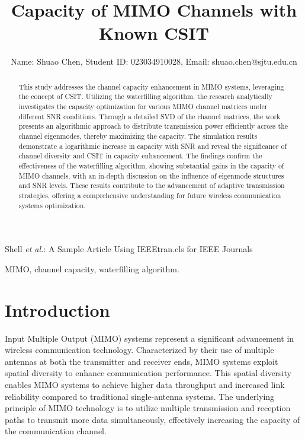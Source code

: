 \documentclass[lettersize,journal]{IEEEtran}
\begin{document}
\title{Capacity of MIMO Channels with Known CSIT}

\author{Name: Shuao Chen, Student ID: 023034910028, Email: shuao.chen@sjtu.edu.cn
}

%
{Shell \MakeLowercase{\textit{et al.}}: A Sample Article Using IEEEtran.cls for IEEE Journals}


\maketitle

\begin{abstract}
This study addresses the channel capacity enhancement in MIMO systems, leveraging the concept of CSIT. Utilizing the waterfilling algorithm, the research analytically investigates the capacity optimization for various MIMO channel matrices under different SNR conditions. Through a detailed SVD of the channel matrices, the work presents an algorithmic approach to distribute transmission power efficiently across the channel eigenmodes, thereby maximizing the capacity. The simulation results demonstrate a logarithmic increase in capacity with SNR and reveal the significance of channel diversity and CSIT in capacity enhancement. The findings confirm the effectiveness of the waterfilling algorithm, showing substantial gains in the capacity of MIMO channels, with an in-depth discussion on the influence of eigenmode structures and SNR levels. These results contribute to the advancement of adaptive transmission strategies, offering a comprehensive understanding for future wireless communication systems optimization.
\end{abstract}

\begin{IEEEkeywords}
MIMO, channel capacity, waterfilling algorithm.
\end{IEEEkeywords}

\section{Introduction}
 Input Multiple Output (MIMO) systems represent a significant advancement in wireless communication technology. Characterized by their use of multiple antennas at both the transmitter and receiver ends, MIMO systems exploit spatial diversity to enhance communication performance\cite{lu2014overview}. This spatial diversity enables MIMO systems to achieve higher data throughput and increased link reliability compared to traditional single-antenna systems. The underlying principle of MIMO technology is to utilize multiple transmission and reception paths to transmit more data simultaneously, effectively increasing the capacity of the communication channel.
\end{document}
